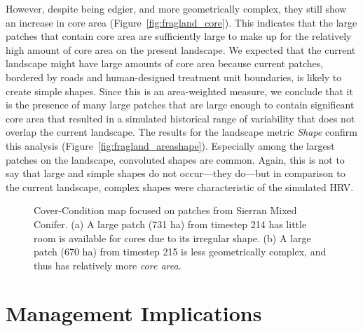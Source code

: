 However, despite being edgier, and more geometrically complex, they still show an increase in core area (Figure~\ref{fig:fragland_core}). This indicates that the large patches that contain core area are sufficiently large to make up for the relatively high amount of core area on the present landscape. We expected that the current landscape might have large amounts of core area because current patches, bordered by roads and human-designed treatment unit boundaries, is likely to create simple shapes. Since this is an area-weighted measure, we conclude that it is the presence of many large patches that are large enough to contain significant core area that resulted in a simulated historical range of variability that does not overlap the current landscape. The results for the landscape metric \emph{Shape} confirm this analysis (Figure~\ref{fig:fragland_areashape}). Especially among the largest patches on the landscape, convoluted shapes are common. Again, this is not to say that large and simple shapes do not occur---they do---but in comparison to the current landscape, complex shapes were characteristic of the simulated HRV.
\begin{figure}[!htbp]
  \centering
  \caption{Cover-Condition map focused on patches from Sierran Mixed Conifer. (a) A large patch (731 ha) from timestep 214 has little room is available for cores due to its irregular shape. (b) A large patch (670 ha) from timestep 215 is less geometrically complex, and thus has relatively more \emph{core area}.} %
  \label{fig:patchmaps4}
\end{figure}

\clearpage
\section{Management Implications}

